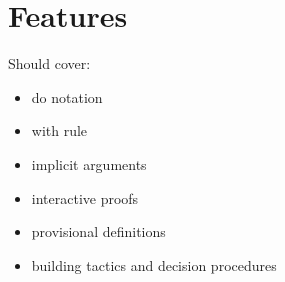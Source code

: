 \section{Features}

Should cover:

\begin{itemize}
\item do notation
\item with rule
\item implicit arguments
\item interactive proofs
\item provisional definitions
\item building tactics and decision procedures
\end{itemize}